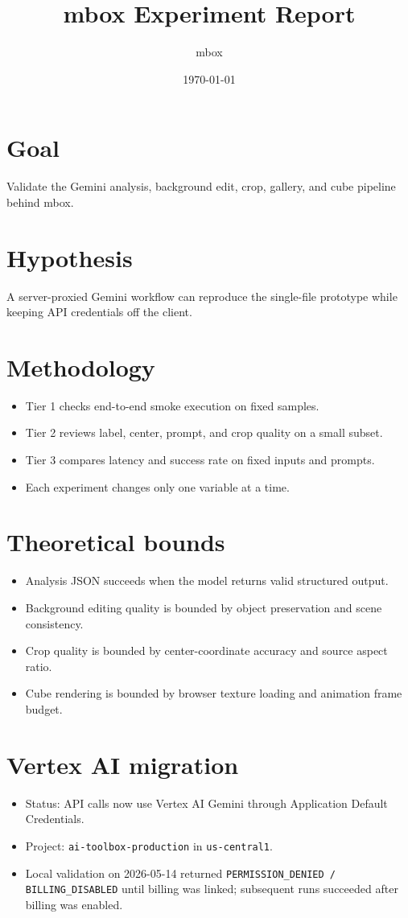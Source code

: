 \documentclass{article}
\title{mbox Experiment Report}
\author{mbox}
\date{\today}
\begin{document}
\maketitle

\section{Goal}
Validate the Gemini analysis, background edit, crop, gallery, and cube pipeline behind mbox.

\section{Hypothesis}
A server-proxied Gemini workflow can reproduce the single-file prototype while keeping API credentials off the client.

\section{Methodology}
\begin{itemize}
  \item Tier 1 checks end-to-end smoke execution on fixed samples.
  \item Tier 2 reviews label, center, prompt, and crop quality on a small subset.
  \item Tier 3 compares latency and success rate on fixed inputs and prompts.
  \item Each experiment changes only one variable at a time.
\end{itemize}

\section{Theoretical bounds}
\begin{itemize}
  \item Analysis JSON succeeds when the model returns valid structured output.
  \item Background editing quality is bounded by object preservation and scene consistency.
  \item Crop quality is bounded by center-coordinate accuracy and source aspect ratio.
  \item Cube rendering is bounded by browser texture loading and animation frame budget.
\end{itemize}

\section{Vertex AI migration}
\begin{itemize}
  \item Status: API calls now use Vertex AI Gemini through Application Default Credentials.
  \item Project: \texttt{ai-toolbox-production} in \texttt{us-central1}.
  \item Local validation on 2026-05-14 returned \texttt{PERMISSION\_DENIED / BILLING\_DISABLED} until billing was linked; subsequent runs succeeded after billing was enabled.
\end{itemize}
\end{document}
